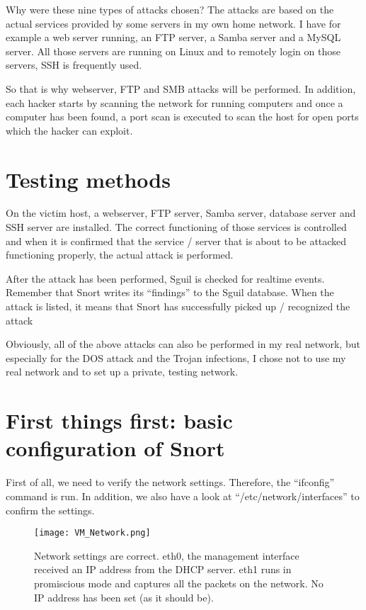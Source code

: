 Why were these nine types of attacks chosen? The attacks are based on the actual services provided by some servers in my own home network. I have for example a web server running, an FTP server, a Samba server and a MySQL server. All those servers are running on Linux and to remotely login on those servers, SSH is frequently used.

So that is why webserver, FTP and SMB attacks will be performed. In addition, each hacker starts by scanning the network for running computers and once a computer has been found, a port scan is executed to scan the host for open ports which the hacker can exploit.

\section{Testing methods}

On the victim host, a webserver, FTP server, Samba server, database server and SSH server are installed. The correct functioning of those services is controlled and when it is confirmed that the service / server that is about to be attacked functioning properly, the actual attack is performed.

After the attack has been performed, Sguil is checked for realtime events. Remember that Snort writes its ``findings'' to the Sguil database. When the attack is listed, it means that Snort has successfully picked up / recognized the attack

Obviously, all of the above attacks can also be performed in my real network, but especially for the DOS attack and the Trojan infections, I chose not to use my real network and to set up a private, testing network.

\section{First things first: basic configuration of Snort}

First of all, we need to verify the network settings. Therefore, the ``ifconfig'' command is run. In addition, we also have a look at ``/etc/network/interfaces'' to confirm the settings.

\begin{figure}[h]
    \centering
    \texttt{[image: VM\_Network.png]}
    \caption{Network settings are correct. eth0, the management interface received an IP address from the DHCP server. eth1 runs in promiscious mode and captures all the packets on the network. No IP address has been set (as it should be).}
\end{figure}

